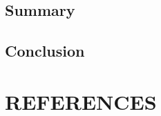 \documentclass[11pt]{report}
\begin{document}
	\section{Summary}
	
	
	\section{Conclusion}
	
	

	
	\chapter*{REFERENCES}
	
	\begin{description}
		\item 
	\end{description}
	
\end{document}
